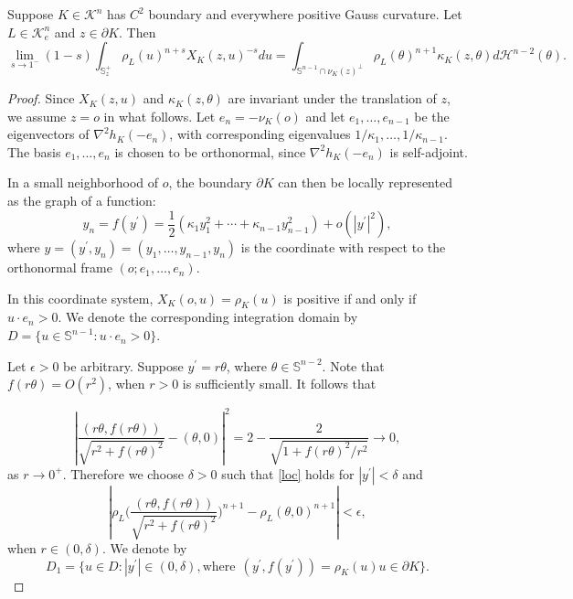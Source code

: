 \documentclass[10pt,a4paper]{amsart}
\newcommand{\sn}{{\mathbb S}^{n-1}}
\newcommand{\tH}{\mathcal{H}}
\newcommand{\tk}{\mathcal{K}}
\begin{document}
\begin{lemma}\label{conv} Suppose $K\in\tk^n$ has $C^2$ boundary and everywhere positive Gauss curvature. Let $L\in\tk_e^n$ and $z\in\partial K$. Then
    \[\lim_{s\rightarrow 1^-}(1-s)\int_{\mathbb S_z^+}\rho_L(u)^{n+ s}X_K(z,u)^{-s}du=\int_{\sn\cap \nu_K(z)^{\perp}}\rho_L(\theta)^{n+1}\kappa_K(z,\theta)d\tH^{n-2}( \theta).\]
\end{lemma}

\begin{proof}
    Since $X_K(z,u)$ and $\kappa_K(z,\theta)$ are invariant under the translation of $z$, we assume $z=o$ in what follows.    
    Let $e_n=-\nu_K(o)$ and let $e_1,\ldots ,e_{n-1}$ be the eigenvectors of $\nabla^2h_K(-e_n)$, with  corresponding eigenvalues $1/\kappa_1,\ldots, 1/\kappa_{n-1}$. The basis $e_1,\ldots, e_n$ is chosen to be orthonormal, since $\nabla^2h_K(-e_n)$ is self-adjoint.
    
    In a small neighborhood of $o$, the boundary $\partial K$ can then be locally represented as the graph of a function:
    \begin{equation}\label{loc}
        y_n=f(y^{\prime})=\frac{1}{2}(\kappa_1y_1^2+\cdots +\kappa_{n-1}y_{n-1}^2)+o(|y^\prime|^2),
    \end{equation}
    where $y=(y^{\prime},y_n)=(y_1,\ldots,y_{n-1},y_n)$ is the coordinate with respect to the orthonormal frame $(o; e_1,\ldots,e_n)$.

    In this coordinate system, $X_K(o,u)=\rho_K(u)$ is positive if and only if $ u\cdot e_n>0$. We denote the corresponding integration domain by $D=\{u\in\sn:  u\cdot e_n>0\}$. 
    
    Let $\epsilon>0$ be arbitrary. Suppose $y^{\prime}=r\theta$, where $\theta\in \mathbb S^{n-2}$. Note that  $f(r\theta)=O(r^2)$, when $r>0$ is sufficiently small. It follows that

    \[
    \left|\frac{(r\theta, f(r\theta))}{\sqrt{r^2+f(r\theta)^2}} - (\theta, 0)\right|^2
    = 2 - \frac{2}{\sqrt{1 + f(r\theta)^2 / r^2}} \to 0,
    \]
     as $r\rightarrow 0^+$. Therefore we choose $\delta>0$ such that \eqref{loc} holds for $|y^{\prime}|<\delta$ and 
    \begin{equation}\label{lem 1 appro 1}
        \left|\rho_L\bigg(\frac{(r\theta, f(r\theta))}{\sqrt{r^2+f(r\theta)^2}}\bigg)^{n+1}-\rho_L(\theta,0)^{n+1}\right|<\epsilon,
    \end{equation}
    when $r\in(0,\delta)$. We denote by
    \[D_1=\{u\in D: |y^{\prime}|\in (0,\delta), \text{where}~~(y^{\prime},f(y^{\prime}))=\rho_K(u)u\in\partial K \}.\]
    

\end{proof}
\end{document}
